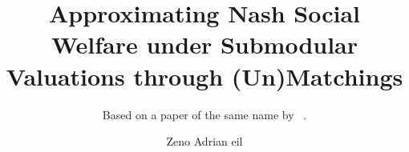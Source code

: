 \documentclass[draft]{scrartcl}
\title{Approximating Nash Social Welfare under Submodular Valuations through (Un)Matchings}
\subtitle{Based on a paper of the same name by \citeauthor{APNSWuSVþUM}~\cite{APNSWuSVþUM}.}
\author{Zeno Adrian \texorpdfstring{\Lss05{W\kern-1.5pt}}{W}eil}
\date{\oldstylenums{\today}}
\begin{document}
	\maketitle

	\begin{abstract}
		\lipsum[6-8]
	\end{abstract}

	\tableofcontents

	\listoftodos

	

	

	

	

	

	\clearpage

	\mybibliography
\end{document}
